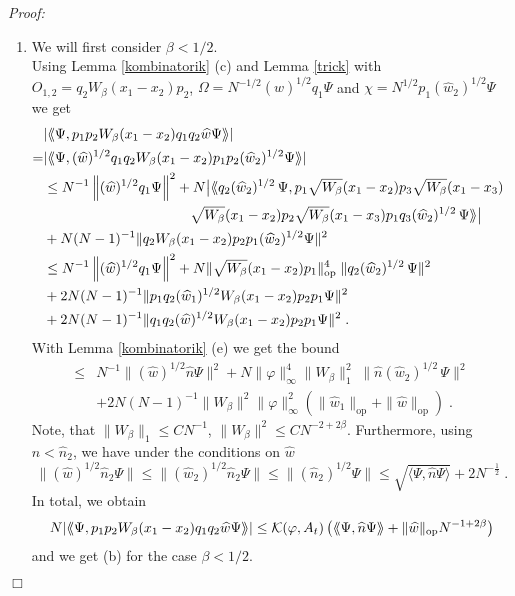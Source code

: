 \documentclass[11pt, english, american]{article}
\newcommand{\be}{\begin{equation}}
\newcommand{\ee}{\end{equation}}
\newcommand{\laa}{\langle\hspace{-0.08cm}\langle}
\newcommand{\raa}{\rangle\hspace{-0.08cm}\rangle}
\newenvironment{proof}{\emph{Proof:}}{\begin{flushright} $ \Box $ \end{flushright}}
\renewcommand{\phi}{\varphi}
\begin{document}
\begin{proof}
\begin{enumerate}
\item
We will first consider  $\beta<1/2$.\\
Using Lemma \ref{kombinatorik} (c) and Lemma \ref{trick} with $O_{1,2}=q_2
W_\beta(x_1-x_2) p_2$, $\Omega=N^{-1/2}(\widehat{w})^{1/2}q_1\Psi$ and $\chi=N^{1/2}p_1(\widehat{w}_{2})^{1/2}\Psi$ we get
 \begin{align*}
&|\laa\Psi ,p_1 p_2 W_\beta(x_1-x_2) q_1 q_2
\widehat{w}\Psi\raa|
%
\\=&|\laa\Psi ,(\widehat{w})^{1/2}q_1 q_2
W_\beta(x_1-x_2)p_1 p_2(\widehat{w}_{2})^{1/2}\Psi\raa|
%
%
\\&\leq N^{-1}\left\|(\widehat{w})^{1/2}q_1\Psi\right\|^2+N\big|\laa q_2(\widehat{w}_{2})^{1/2}\,\Psi,p_1\sqrt{W_\beta}(x_1-x_2)
p_3
\sqrt{W_\beta}(x_1-x_3)\\&\hspace{3.7cm}\sqrt{W_\beta}(x_1-x_2)p_2\sqrt{W_\beta}(x_1-x_3)p_1
q_3(\widehat{w}_{2})^{1/2}\,\Psi\raa\big|
%
\\&+N(N-1)^{-1}\|q_2
W_\beta(x_1-x_2) p_2p_1(\widehat{w}_{2})^{1/2}\Psi\|^2&
%
\\&\leq N^{-1}\left\|(\widehat{w})^{1/2}q_1\Psi\right\|^2+N\|\sqrt{W_\beta}(x_1-x_2)p_1\|_{\text{op}}^4\;\|
q_2(\widehat{w}_{2})^{1/2}\,\Psi\|^2
%
\\&+2 N(N-1)^{-1}\|p_1q_2(\widehat{w}_{1})^{1/2}
W_\beta(x_1-x_2) p_2p_1\Psi\|^2
\\&+2 N(N-1)^{-1}\|q_1q_2 (\widehat{w})^{1/2}
W_\beta(x_1-x_2) p_2p_1\Psi\|^2
\;.
 \end{align*}
 With  Lemma \ref{kombinatorik} (e) we get the bound
 \begin{align*}
 \leq&  N^{-1}\|(\widehat{w})^{1/2}\widehat{n}\Psi\|^2+N\|\phi  \|_\infty^4\|W_\beta\|_1^2\;\|
\widehat{n}(\widehat{w}_{2})^{1/2}\,\Psi\|^2
%
\\&+2 N(N-1)^{-1}\|W_\beta\|^2\|\phi  \|_\infty^2
\left(
\| \widehat{w}_{1}\|_{\text{op}}
+
\| \widehat{w}\|_{\text{op}}
\right)
%
\;.
 \end{align*}
Note, that $\|W_\beta\|_1\leq CN^{-1}$, $\|W_\beta\|^2\leq CN^{-2+2\beta}$.
Furthermore, using $\widehat n<\widehat n_2$, we have under the conditions on $\widehat{w}$
\be
\label{einfuegen}
\|(\widehat{w})^{1/2}\widehat{n}_2\Psi\|
\leq
\|(\widehat{w}_2)^{1/2}\widehat{n}_2\Psi\|\leq
\|(\widehat{n}_2)^{1/2}\Psi\|
\leq
\sqrt{\langle\Psi,\widehat{n}\Psi\rangle}+2N^{-\frac{1}{2}}
\;.
\ee
In total, we obtain
\begin{align*}
%
N|\laa\Psi ,p_1 p_2 W_\beta(x_1-x_2) q_1 q_2
\widehat{w}\Psi\raa|\leq 
 \mathcal{K}(\phi, A_t)
\left(\laa\Psi,\widehat{n}\Psi\raa+ \| \widehat{w}\|_{\text{op}} N^{-1+2 \beta}\right)
%
\end{align*}
and we get (b) for the case $\beta<1/2$.



\end{enumerate}
\end{proof}
\end{document}
